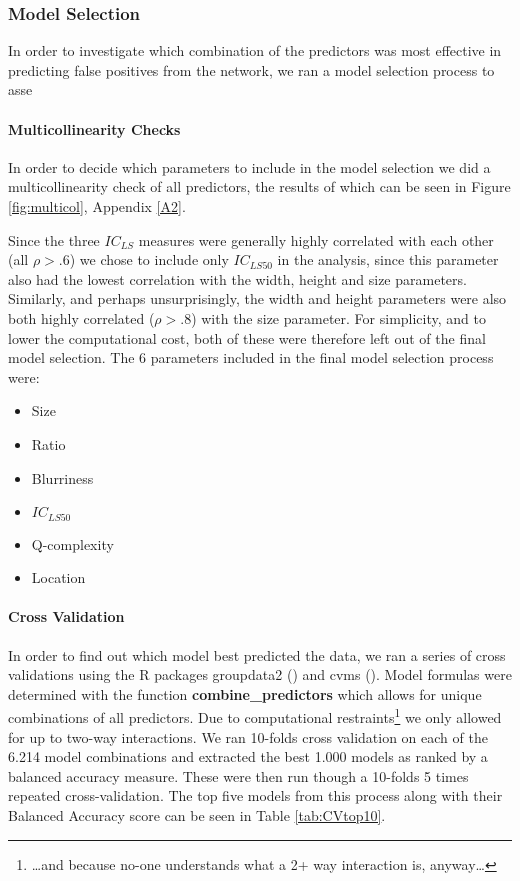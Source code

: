 \documentclass[12pt]{article}
\begin{document}
\subsubsection{Model Selection}
In order to investigate which combination of the predictors was most effective in predicting false positives from the network, we ran a model selection process to asse

\paragraph{Multicollinearity Checks}
In order to decide which parameters to include in the model selection we did a multicollinearity check of all predictors, the results of which can be seen in Figure \ref{fig:multicol}, Appendix \ref{A2}.

Since the three $IC_{LS}$ measures were generally highly correlated with each other (all $\rho > .6$) we chose to include only $IC_{LS50}$ in the analysis, since this parameter also had the lowest correlation with the width, height and size parameters. 
Similarly, and perhaps unsurprisingly, the width and height parameters were also both highly correlated ($\rho > .8$) with the size parameter. For simplicity, and to lower the computational cost, both of these were therefore left out of the final model selection.
The 6 parameters included in the final model selection process were:
\begin{itemize}
	\item Size
	\item Ratio
	\item Blurriness
	\item $IC_{LS50}$
	\item Q-complexity
	\item Location 
\end{itemize}

\paragraph{Cross Validation}
In order to find out which model best predicted the data, we ran a series of cross validations using the R packages groupdata2 (\cite{olsenGroupdata22020}) and cvms (\cite{olsenCvms2020}).
Model formulas were determined with the function \textbf{combine\_predictors} which allows for unique combinations of all predictors. Due to computational restraints\footnote{\dots and because no-one understands what a 2+ way interaction is, anyway\dots} we only allowed for up to two-way interactions. We ran 10-folds cross validation on each of the 6.214 model combinations and extracted the best 1.000 models as ranked by a balanced accuracy measure. These were then run though a 10-folds 5 times repeated cross-validation. The top five models from this process along with their Balanced Accuracy score can be seen in Table \ref{tab:CVtop10}.
\end{document}
